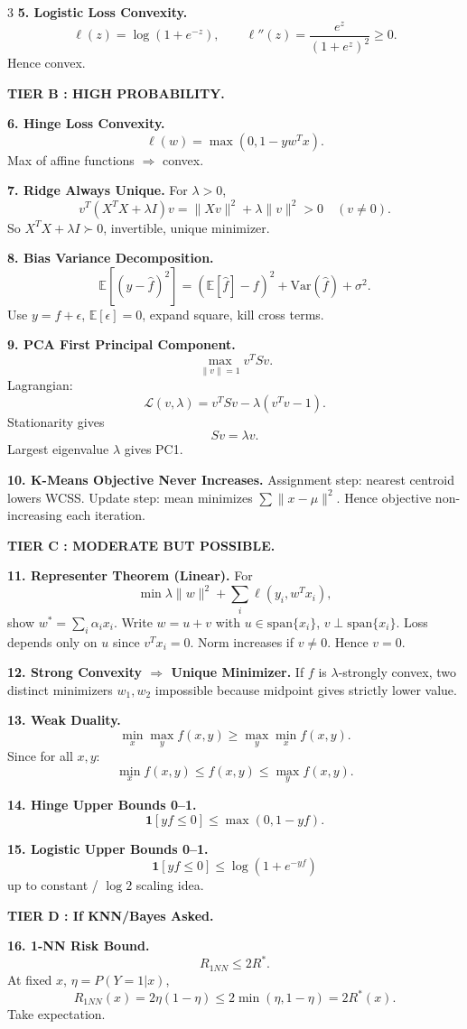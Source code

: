 \documentclass[8pt,fleqn]{extarticle}
\begin{document}
\begin{multicols}{3}
\textbf{5. Logistic Loss Convexity.}
\[
\ell(z)=\log(1+e^{-z}),\qquad \ell''(z)=\frac{e^z}{(1+e^z)^2}\ge0.
\]
Hence convex.

\textbf{TIER B : HIGH PROBABILITY.}

\textbf{6. Hinge Loss Convexity.}
\[
\ell(w)=\max(0,1-yw^Tx).
\]
Max of affine functions $\Rightarrow$ convex.

\textbf{7. Ridge Always Unique.}
For $\lambda>0$,
\[
v^T(X^TX+\lambda I)v=\|Xv\|^2+\lambda\|v\|^2>0 \quad (v\neq0).
\]
So $X^TX+\lambda I\succ0$, invertible, unique minimizer.

\textbf{8. Bias Variance Decomposition.}
\[
\mathbb{E}[(y-\hat f)^2]=(\mathbb{E}[\hat f]-f)^2+\mathrm{Var}(\hat f)+\sigma^2.
\]
Use $y=f+\epsilon$, $\mathbb{E}[\epsilon]=0$, expand square, kill cross terms.

\textbf{9. PCA First Principal Component.}
\[
\max_{\|v\|=1}v^TSv.
\]
Lagrangian:
\[
\mathcal L(v,\lambda)=v^TSv-\lambda(v^Tv-1).
\]
Stationarity gives
\[
Sv=\lambda v.
\]
Largest eigenvalue $\lambda$ gives PC1.

\textbf{10. K-Means Objective Never Increases.}
Assignment step: nearest centroid lowers WCSS. Update step: mean minimizes $\sum\|x-\mu\|^2$. Hence objective non-increasing each iteration.

\textbf{TIER C : MODERATE BUT POSSIBLE.}

\textbf{11. Representer Theorem (Linear).}
For
\[
\min \lambda\|w\|^2+\sum_i \ell(y_i,w^Tx_i),
\]
show $w^*=\sum_i\alpha_i x_i$.
Write $w=u+v$ with $u\in\mathrm{span}\{x_i\}$, $v\perp\mathrm{span}\{x_i\}$. Loss depends only on $u$ since $v^Tx_i=0$. Norm increases if $v\neq0$. Hence $v=0$.

\textbf{12. Strong Convexity $\Rightarrow$ Unique Minimizer.}
If $f$ is $\lambda$-strongly convex, two distinct minimizers $w_1,w_2$ impossible because midpoint gives strictly lower value.

\textbf{13. Weak Duality.}
\[
\min_x\max_y f(x,y)\ge \max_y\min_x f(x,y).
\]
Since for all $x,y$:
\[
\min_x f(x,y)\le f(x,y)\le \max_y f(x,y).
\]

\textbf{14. Hinge Upper Bounds 0--1.}
\[
\mathbf{1}[yf\le0]\le \max(0,1-yf).
\]

\textbf{15. Logistic Upper Bounds 0--1.}
\[
\mathbf{1}[yf\le0]\le \log(1+e^{-yf})
\]
up to constant / $\log2$ scaling idea.

\textbf{TIER D : If KNN/Bayes Asked.}

\textbf{16. 1-NN Risk Bound.}
\[
R_{1NN}\le 2R^*.
\]
At fixed $x$, $\eta=P(Y=1|x)$,
\[
R_{1NN}(x)=2\eta(1-\eta)\le2\min(\eta,1-\eta)=2R^*(x).
\]
Take expectation.


\end{multicols}
\end{document}
